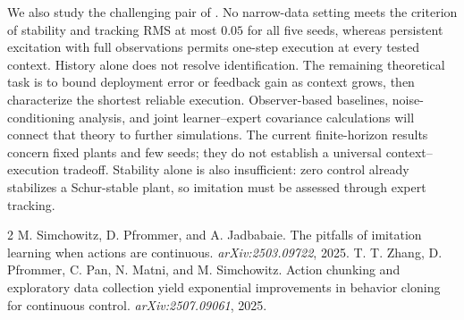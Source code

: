 \documentclass{l4dc2026}
\begin{document}
We also study the challenging pair of \citet{simchowitz2025}. No narrow-data setting meets the criterion of stability and tracking RMS at most $0.05$ for all five seeds, whereas persistent excitation with full observations permits one-step execution at every tested context. History alone does not resolve identification. The remaining theoretical task is to bound deployment error or feedback gain as context grows, then characterize the shortest reliable execution. Observer-based baselines, noise-conditioning analysis, and joint learner--expert covariance calculations will connect that theory to further simulations. The current finite-horizon results concern fixed plants and few seeds; they do not establish a universal context--execution tradeoff. Stability alone is also insufficient: zero control already stabilizes a Schur-stable plant, so imitation must be assessed through expert tracking.

\begin{thebibliography}{2}
M. Simchowitz, D. Pfrommer, and A. Jadbabaie.
The pitfalls of imitation learning when actions are continuous.
\emph{arXiv:2503.09722}, 2025.
T. T. Zhang, D. Pfrommer, C. Pan, N. Matni, and M. Simchowitz.
Action chunking and exploratory data collection yield exponential improvements in behavior cloning for continuous control.
\emph{arXiv:2507.09061}, 2025.
\end{thebibliography}
\end{document}
